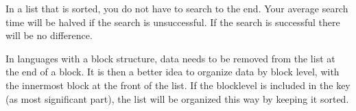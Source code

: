 In a list that is sorted, you do not have to search to the end. Your
average search time will be halved if the search is unsuccessful. If
the search is successful there will be no difference.

In languages with a block structure, data needs to be removed from the
list at the end of a block. It is then a better idea to organize data
by block level, with the innermost block at the front of the list. If
the blocklevel is included in the key (as most significant part), the
list will be organized this way by keeping it sorted.
